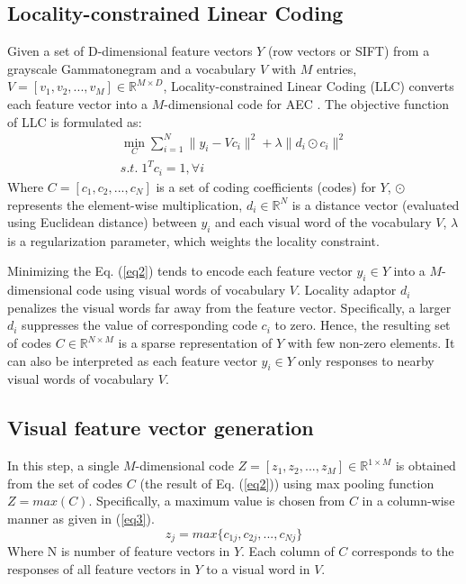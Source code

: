 \documentclass[a4paper]{article}
\DeclareMathOperator*{\argmin}{\min}
\begin{document}
\subsection{Locality-constrained Linear Coding}
Given a set of D-dimensional feature vectors $Y$ (row vectors or SIFT) from a grayscale  Gammatonegram and a vocabulary $V$ with $M$ entries, $V=[v_1,  v_2,...,v_M] \in \mathbb{R}^{M\times D}$, Locality-constrained Linear Coding (LLC) converts each feature vector into a $M$-dimensional code for AEC \cite{wang2010locality}. The objective function of LLC is formulated as:
\begin{equation}
\begin{multlined}
\argmin\limits_{C}\sum_{i=1}^{N}\|y_i-Vc_i\|^2+\lambda\|d_i\odot c_i\|^2\\
s.t.\; 1^Tc_i=1, \forall i \;\;\;\;\;\;\;\;\;\;\;\;\;\;\;\;\;\;\;\;\;\;\;\;\;\;\;\;\;\;\;\;\;
\end{multlined}
\label{eq2}
\end{equation}
Where $C=[c_1, c_2,..., c_N]$ is a set of coding coefficients (codes) for $Y$, $\odot$ represents the element-wise multiplication, $d_i\in \mathbb{R}^N$ is a distance vector (evaluated using Euclidean distance) between $y_i$ and each visual word of the vocabulary $V$, $\lambda$ is a regularization parameter, which weights the locality constraint.

Minimizing the Eq. (\ref{eq2}) tends to encode each feature vector $y_i \in Y$ into a $M$-dimensional code using visual words of vocabulary $V$. Locality adaptor $d_i$ penalizes the visual words far away from the feature vector. 
Specifically, a larger $d_i$ suppresses the value of corresponding code $c_i$ to zero. 
Hence, the resulting set of codes $C \in \mathbb{R}^{N\times M}$ is a sparse representation of $Y$ with few non-zero elements. It can also be interpreted as each feature vector $y_i \in Y$ only responses to nearby visual words of vocabulary $V$. 
\subsection{Visual feature vector generation}
In this step, a single $M$-dimensional code $Z=[z_1,z_2,...,z_M]\in \mathbb{R}^{1\times M}$ is obtained from the set of codes  $C$ (the result of Eq. (\ref{eq2})) using max pooling function $Z=max(C)$. Specifically, a maximum value is chosen from $C$ in a column-wise manner as given in (\ref{eq3}).
\begin{equation}
z_j=max\{c_{1j},c_{2j},...,c_{Nj}\}
\label{eq3}
\end{equation}
Where N is number of feature vectors in $Y$.
Each column  of $C$ corresponds to the responses of all feature vectors in $Y$ to a visual word in $V.$ 
\end{document}
